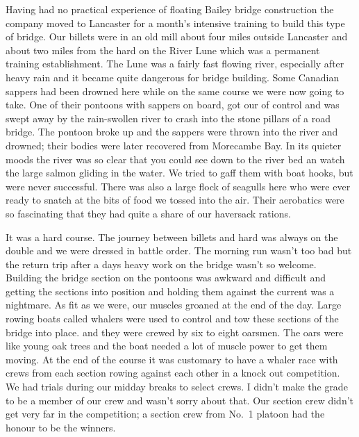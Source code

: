Having had no practical experience of floating Bailey bridge
construction the company moved to Lancaster for a month's intensive
training to build this type of bridge. Our billets were in an old
mill about four miles outside Lancaster and about two miles from the
hard on the River Lune which was a permanent training establishment.
The Lune was a fairly fast flowing river, especially after heavy rain
and it became quite dangerous for bridge building. Some Canadian
sappers had been drowned here while on the same course we were now
going to take. One of their pontoons with sappers on board, got our
of control and was swept away by the rain-swollen river to crash into
the stone pillars of a road bridge. The pontoon broke up and the
sappers were thrown into the river and drowned; their bodies were
later recovered from Morecambe Bay. In its quieter moods the river was
so clear that you could see down to the river bed an watch the large
salmon gliding in the water. We tried to gaff them with boat hooks,
but were never successful. There was also a large flock of seagulls
here who were ever ready to snatch at the bits of food we tossed into
the air. Their aerobatics were so fascinating that they had quite a
share of our haversack rations.

It was a hard course. The journey between billets and hard was always
on the double and we were dressed in battle order. The morning run
wasn't too bad but the return trip after a days heavy work on the
bridge wasn't so welcome. Building the bridge section on the pontoons
was awkward and difficult and getting the sections into position and
holding them against the current was a nightmare. As fit as we were,
our muscles groaned at the end of the day. Large rowing boats called
whalers were used to control and tow these sections of the bridge
into place. and they were crewed by six to eight oarsmen. The oars
were like young oak trees and the boat needed a lot of muscle power to
get them moving. At the end of the course it was customary to have a
whaler race with crews from each section rowing against each other in
a knock out competition. We had trials during our midday breaks to
select crews. I didn't make the grade to be a member of our crew and
wasn't sorry about that. Our section crew didn't get very far in the
competition; a section crew from No.~1 platoon had the honour to be the
winners.

